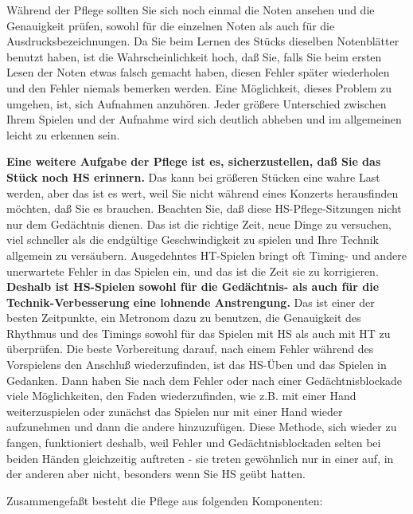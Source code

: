Während der Pflege sollten Sie sich noch einmal die Noten ansehen und die Genauigkeit prüfen, sowohl für die einzelnen Noten als auch für die Ausdrucksbezeichnungen.
Da Sie beim Lernen des Stücks dieselben Notenblätter benutzt haben, ist die Wahrscheinlichkeit hoch, daß Sie, falls Sie beim ersten Lesen der Noten etwas falsch gemacht haben, diesen Fehler später wiederholen und den Fehler niemals bemerken werden. 
Eine Möglichkeit, dieses Problem zu umgehen, ist, sich Aufnahmen anzuhören.
Jeder größere Unterschied zwischen Ihrem Spielen und der Aufnahme wird sich deutlich abheben und im allgemeinen leicht zu erkennen sein.

\textbf{Eine weitere Aufgabe der Pflege ist es, sicherzustellen, daß Sie das Stück noch HS erinnern.}
Das kann bei größeren Stücken eine wahre Last werden, aber das ist es wert, weil Sie nicht während eines Konzerts herausfinden möchten, daß Sie es brauchen.
Beachten Sie, daß diese HS-Pflege-Sitzungen nicht nur dem Gedächtnis dienen.
Das ist die richtige Zeit, neue Dinge zu versuchen, viel schneller als die endgültige Geschwindigkeit zu spielen und Ihre Technik allgemein zu versäubern.
Ausgedehntes HT-Spielen bringt oft Timing- und andere unerwartete Fehler in das Spielen ein, und das ist die Zeit sie zu korrigieren.
\textbf{Deshalb ist HS-Spielen sowohl für die Gedächtnis- als auch für die Technik-Verbesserung eine lohnende Anstrengung.}
Das ist einer der besten Zeitpunkte, ein Metronom dazu zu benutzen, die Genauigkeit des Rhythmus und des Timings sowohl für das Spielen mit HS als auch mit HT zu überprüfen.
Die beste Vorbereitung darauf, nach einem Fehler während des Vorspielens den Anschluß wiederzufinden, ist das HS-Üben und das Spielen in Gedanken.
Dann haben Sie nach dem Fehler oder nach einer Gedächtnisblockade viele Möglichkeiten, den Faden wiederzufinden, wie z.B. mit einer Hand weiterzuspielen oder zunächst das Spielen nur mit einer Hand wieder aufzunehmen und dann die andere hinzuzufügen.
Diese Methode, sich wieder zu fangen, funktioniert deshalb, weil Fehler und Gedächtnisblockaden selten bei beiden Händen gleichzeitig auftreten - sie treten gewöhnlich nur in einer auf, in der anderen aber nicht, besonders wenn Sie HS geübt hatten.

Zusammengefaßt besteht die Pflege aus folgenden Komponenten:

